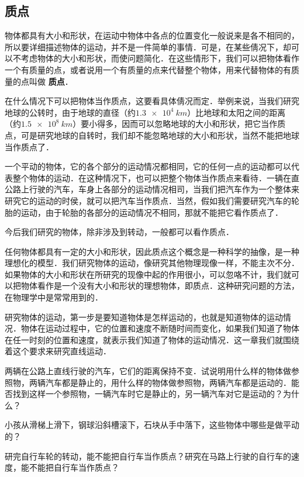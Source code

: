 \begin{Quiz}
\section{质点}

物体都具有大小和形状，在运动中物体中各点的位置变化一般说来是各不相同的，所以要详细描述物体的运动，并不是一件简单的事情．可是，在某些倩况下，却可以不考虑物体的大小和形状，而使问题简化．在这些情形下，我们可以把物体看作一个有质量的点，或者说用一个有质量的点来代替整个物体，用来代替物体的有质量的点叫做\textbf{ 质点}．

在什么情况下可以把物体当作质点，这要看具体倩况而定．举例来说，当我们研究地球的公转时，由于地球的直径（约$\qty{1.3e4}{km}$）比地球和太阳之间的距离（约$\qty{1.5e8}{km}$）要小得多，因而可以忽略地球的大小和形状，把它当作质点，可是研究地球的自转时，我们却不能忽略地球的大小和形状，当然不能把地球当作质点了．

一个平动的物体，它的各个部分的运动情况都相同，它的任何一点的运动都可以代表整个物体的运动．在这种情况下，也可以把整个物体当作质点来看待．一辆在直公路上行驶的汽车，车身上各部分的运动情况相司，当我们把汽车作为一个整体来研究它的运动的时侯，就可以把汽车当作质点．当然，假如我们需要研究汽车的轮胎的运动，由于轮胎的各部分的运动情况不相同，那就不能把它看作质点了．

今后我们研究的物体，除非涉及到转动，一般都可以看作质点．

任何物体都具有一定的大小和形状，因此质点这个概念是一种科学的抽像，是一种理想化的模型．我们研究物体的运动，像研究其他物理现像一样，不能主次不分．如果物体的大小和形状在所研究的现像中起的作用很小，可以忽咯不计，我们就可以把物体看作是一个没有大小和形状的理想物体，即质点．这种研究问题的方法，在物理学中是常常用到的．

研究物体的运动，第一步是要知道物体是怎样运动的，也就是知道物体的运动情况．物体在运动过程中，它的位置和速度不断随时间而变化，如果我们知道了物体在任一时刻的位置和速度，就表示我们知道了物体的运动情况．这一章我们就围绕着这个要求来研究直线运动．

\begin{Exercise}
	\begin{QsNum}
	    \item 两辆在公路上直线行驶的汽车，它们的距离保持不变．试说明用什么样的物体做参照物，两辆汽车都是静止的，用什么样的物体做参照物，两辆汽车都是运动的．能否找到这样一个参照物，一辆汽车时它是静止的，另一辆汽车对它是运动的？为什么？
	
	    \item 小孩从滑梯上滑下，钢球沿斜槽滚下，石块从手中落下，这些物体中哪些是做平动的？
	
	    \item 研完自行车轮的转动，能不能把自行车当作质点？研究在马路上行驶的自行车的速度，能不能把自行车当作质点？
    \end{QsNum}
\end{Exercise}

\end{Quiz}



